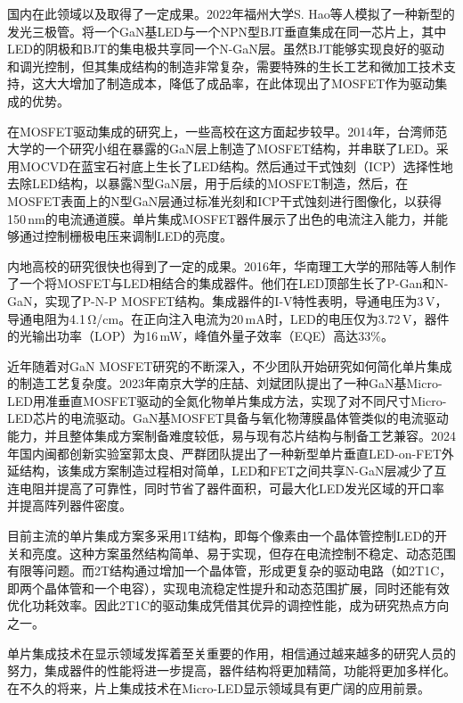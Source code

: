 \documentclass[
    oneside,                %
    fontset = win, %
  ]{njuthesis}
\begin{document}
国内在此领域以及取得了一定成果。2022年福州大学S. Hao等人模拟了一种新型的发光三极管\cite{hao2022fully}。将一个GaN基LED与一个NPN型BJT垂直集成在同一芯片上，其中LED的阴极和BJT的集电极共享同一个N-GaN层。虽然BJT能够实现良好的驱动和调光控制，但其集成结构的制造非常复杂，需要特殊的生长工艺和微加工技术支持，这大大增加了制造成本，降低了成品率，在此体现出了MOSFET作为驱动集成的优势。

在MOSFET驱动集成的研究上，一些高校在这方面起步较早。2014年，台湾师范大学的一个研究小组在暴露的GaN层上制造了MOSFET结构，并串联了LED\cite{huang2015enhanced}。采用MOCVD在蓝宝石衬底上生长了LED结构。然后通过干式蚀刻（ICP）选择性地去除LED结构，以暴露N型GaN层，用于后续的MOSFET制造，然后，在MOSFET表面上的N型GaN层通过标准光刻和ICP干式蚀刻进行图像化，以获得150\,nm的电流通道膜。单片集成MOSFET器件展示了出色的电流注入能力，并能够通过控制栅极电压来调制LED的亮度。

内地高校的研究很快也得到了一定的成果。2016年，华南理工大学的邢陆等人制作了一个将MOSFET与LED相结合的集成器件\cite{lu2017high}。他们在LED顶部生长了P-Gan和N-GaN，实现了P-N-P MOSFET结构。集成器件的I-V特性表明，导通电压为3\,V，导通电阻为4.1\,Ω/cm。在正向注入电流为20\,mA时，LED的电压仅为3.72\,V，器件的光输出功率（LOP）为16\,mW，峰值外量子效率（EQE）高达33\%。

近年随着对GaN MOSFET研究的不断深入，不少团队开始研究如何简化单片集成的制造工艺复杂度。2023年南京大学的庄喆、刘斌团队提出了一种GaN基Micro-LED用准垂直MOSFET驱动的全氮化物单片集成方法\cite{he2024monolithic}，实现了对不同尺寸Micro-LED芯片的电流驱动。GaN基MOSFET具备与氧化物薄膜晶体管类似的电流驱动能力，并且整体集成方案制备难度较低，易与现有芯片结构与制备工艺兼容。2024年国内闽都创新实验室郭太良、严群团队提出了一种新型单片垂直LED-on-FET外延结构\cite{sang2023monolithic}，该集成方案制造过程相对简单，LED和FET之间共享N-GaN层减少了互连电阻并提高了可靠性，同时节省了器件面积，可最大化LED发光区域的开口率并提高阵列器件密度。

目前主流的单片集成方案多采用1T结构，即每个像素由一个晶体管控制LED的开关和亮度。这种方案虽然结构简单、易于实现，但存在电流控制不稳定、动态范围有限等问题。而2T结构通过增加一个晶体管，形成更复杂的驱动电路（如2T1C，即两个晶体管和一个电容），实现电流稳定性提升和动态范围扩展，同时还能有效优化功耗效率。因此2T1C的驱动集成凭借其优异的调控性能，成为研究热点方向之一。

单片集成技术在显示领域发挥着至关重要的作用，相信通过越来越多的研究人员的努力，集成器件的性能将进一步提高，器件结构将更加精简，功能将更加多样化。在不久的将来，片上集成技术在Micro-LED显示领域具有更广阔的应用前景。
\end{document}
